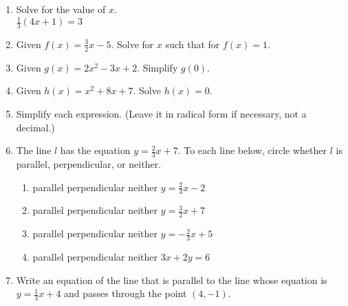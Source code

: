 \documentclass[12pt, twoside]{article}
\begin{document}
\begin{enumerate}
\newpage
  \item   Solve for the value of $x$.\\[0.5cm]
  $\frac{1}{3}(4x+1)=3$ \vspace{3cm}

  \item Given $f(x)=\frac{3}{2} x-5$. Solve for $x$ such that for $f(x)=1$. \vspace{3.5cm}
  \item Given $g(x)=2x^2-3x+2$. Simplify $g(0)$. \vspace{4cm}
  \item Given $h(x)=x^2+8x+7$. Solve $h(x)=0$. \vspace{5cm}

  \item Simplify each expression. (Leave it in radical form if necessary, not a decimal.)
    \begin{enumerate}
    \end{enumerate}


\newpage
  \item The line $l$ has the equation $y=\frac{2}{3}x+7$. To each line below, circle whether $l$ is parallel, perpendicular, or neither.
    \begin{enumerate}
      \item parallel \quad perpendicular \quad neither \qquad $y=\frac{2}{3}x-2$
      \vspace{0.5cm}
      \item parallel \quad perpendicular \quad neither \qquad $y=\frac{3}{2}x+7$
      \vspace{0.5cm}
      \item parallel \quad perpendicular \quad neither \qquad $y=-\frac{2}{3}x+5$
      \vspace{0.5cm}
      \item parallel \quad perpendicular \quad neither \qquad $3x+2y=6$
      \vspace{3.5cm}
    \end{enumerate}

  \item Write an equation of the line that is parallel to the line whose equation is $y=\frac{1}{3}x+4$ and passes through the point $(4,-1)$. \vspace{2cm}


\end{enumerate}
\end{document}
